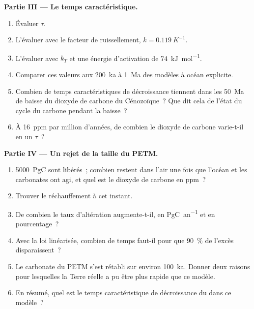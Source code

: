 \begin{problem}
\noindent\textbf{Partie III --- Le temps caractéristique.}
\begin{enumerate}[resume]
  \item Évaluer $\tau$.
  \item L'évaluer avec le facteur de ruissellement, $k = \qty{0.119}{K^{-1}}$.
  \item L'évaluer avec $k_T$ et une énergie d'activation de \qty{74}{kJ.mol^{-1}}.
  \item Comparer ces valeurs aux \qty{200}{ka} à \qty{1}{Ma} des modèles à océan explicite.
  \item Combien de temps caractéristiques de décroissance tiennent dans les \qty{50}{Ma} de baisse du dioxyde de
        carbone du Cénozoïque~? Que dit cela de l'état du cycle du carbone pendant la baisse~?
  \item À \qty{16}{ppm} par million d'années, de combien le dioxyde de carbone varie-t-il en un $\tau$~?
\end{enumerate}

\noindent\textbf{Partie IV --- Un rejet de la taille du PETM.}
\begin{enumerate}[resume]
  \item \qty{5000}{PgC} sont libérés~; combien restent dans l'air une fois que l'océan et les carbonates
        ont agi, et quel est le dioxyde de carbone en ppm~?
  \item Trouver le réchauffement à cet instant.
  \item De combien le taux d'altération augmente-t-il, en \unit{PgC.an^{-1}} et en pourcentage~?
  \item Avec la loi linéarisée, combien de temps faut-il pour que \qty{90}{\percent} de l'excès disparaissent~?
  \item Le carbonate du PETM s'est rétabli sur environ \qty{100}{ka}. Donner deux raisons pour lesquelles la
        Terre réelle a pu être plus rapide que ce modèle.
  \item En résumé, quel est le temps caractéristique de décroissance du  dans ce modèle~?
\end{enumerate}
\end{problem}
